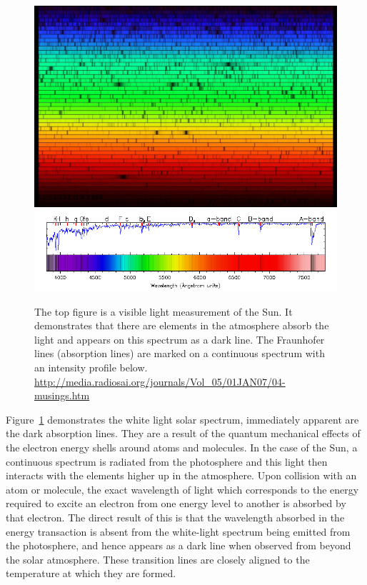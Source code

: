 \begin{figure}
	\centering
	\includegraphics[width=\linewidth]{Chapter1/Figs/sun_spectrum}
	\includegraphics[width=\linewidth]{Chapter1/Figs/fraunhofer_lines}
	\caption{The top figure is a visible light measurement of the Sun. It demonstrates that there are elements in the atmosphere absorb the light and appears on this spectrum as a dark line. The Fraunhofer lines (absorption lines) are marked on a continuous spectrum with an intensity profile below.
	\url{http://media.radiosai.org/journals/Vol_05/01JAN07/04-musings.htm}}
	\label{fig:fraunhofer}
\end{figure}


Figure~\ref{fig:fraunhofer} demonstrates the white light solar spectrum, immediately apparent are the dark absorption lines.
They are a result of the quantum mechanical effects of the electron energy shells around atoms and molecules.
In the case of the Sun, a continuous spectrum is radiated from the photosphere and this light then interacts with the elements higher up in the atmosphere.
Upon collision with an atom or molecule, the exact wavelength of light which corresponds to the energy required to excite an electron from one energy level to another is absorbed by that electron.
The direct result of this is that the wavelength absorbed in the energy transaction is absent from the white-light spectrum being emitted from the photosphere, and hence appears as a dark line when observed from beyond the solar atmosphere.
These transition lines are closely aligned to the temperature at which they are formed.

